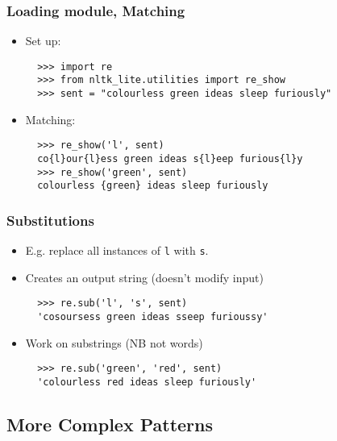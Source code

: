 \documentclass[handout]{beamer}
\begin{document}
\begin{frame}[fragile]
\frametitle{Loading module, Matching}

\begin{itemize}
\item Set up:

\begin{verbatim}
  >>> import re
  >>> from nltk_lite.utilities import re_show
  >>> sent = "colourless green ideas sleep furiously"
\end{verbatim}

\item Matching:

\begin{verbatim}
  >>> re_show('l', sent)
  co{l}our{l}ess green ideas s{l}eep furious{l}y
  >>> re_show('green', sent)
  colourless {green} ideas sleep furiously
\end{verbatim}
\end{itemize}
\end{frame}

\begin{frame}[fragile]
\frametitle{Substitutions}

\begin{itemize}
\item E.g. replace all instances of \texttt{l} with \texttt{s}.
\item Creates an output string (doesn't modify input)

\begin{verbatim}
  >>> re.sub('l', 's', sent)
  'cosoursess green ideas sseep furioussy'
\end{verbatim}

\item Work on substrings (NB not words)

\begin{verbatim}
  >>> re.sub('green', 'red', sent)
  'colourless red ideas sleep furiously'
\end{verbatim}
\end{itemize}
\end{frame}

\subsection{More Complex Patterns}
\end{document}
